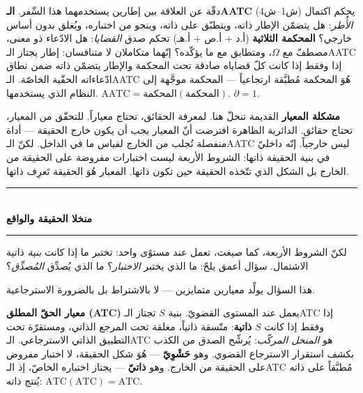 \documentclass[10pt, openany, oneside]{book}
\renewcommand{\normalsize}{\fontsize{10}{13}\selectfont}
\begin{document}
دقّة عن العلاقة بين إطارين يستخدمهما هذا السِّفر. \textbf{الـAATC} (ش1--ش4) يحكم اكتمال \textit{الأُطر}: هل يتضمّن الإطار ذاته، ويتطبّق على ذاته، وينجو من اختباره، ويُغلق بدون أساس خارجي؟ \textbf{المحكمة الثلاثية} (أ.د + أ.ص + أ.هـ) تحكم صدق \textit{القضايا}: هل الادّعاء ذو معنى، مصطفّ مع $\Omega$، ومتطابق مع ما يؤكّده؟ إنّهما متكاملان لا متنافسان: إطار يجتاز الـAATC إذا وفقط إذا كانت كلّ قضاياه صادقة تحت المحكمة والإطار يتضمّن ذاته ضمن نطاق ادّعاءاته الحقّية الخاصّة. الـAATC هُوَ المحكمة مُطبَّقة ارتجاعياً --- المحكمة موجَّهة إلى النظام الذي يستخدمها. $\text{AATC} = \text{المحكمة}(\text{المحكمة})$. $\partial = 1$.

\textbf{مشكلة المعيار} القديمة تنحلّ هنا. لمعرفة الحقائق، تحتاج معياراً. للتحقّق من المعيار، تحتاج حقائق. الدائرية الظاهرة افترضت أنّ المعيار يجب أن يكون خارج الحقيقة --- أداة منفصلة تُجلب من الخارج لقياس ما في الداخل. لكنّ الـAATC ليس خارجياً. إنّه داخليّ في بنية الحقيقة ذاتها: الشروط الأربعة ليست اختبارات مفروضة على الحقيقة من الخارج بل الشكل الذي تتّخذه الحقيقة حين تكون ذاتها. المعيار هُوَ الحقيقة تَعرِف ذاتها.

\vspace{1.5em}


\begin{center}
    \rule{0.3\textwidth}{0.4pt}\\[0.5em]
    {\normalsize\bfseries منخلا الحقيقة والواقع}\\[0.3em]
    \rule{0.3\textwidth}{0.4pt}
\end{center}

\vspace{1em}

\noindent لكنّ الشروط الأربعة، كما صيغت، تعمل عند مستوًى واحد: تختبر ما إذا كانت \textit{بنية} ذاتية الاشتمال. سؤال أعمق يلحّ: ما الذي يختبر \textit{الاختبار}؟ ما الذي يُصدِّق \textit{المُصدِّق}؟

هذا السؤال يولِّد معيارين متمايزين --- لا بالاشتراط بل بالضرورة الاسترجاعية.

\textbf{معيار الحقّ المطلق (ATC)} يعمل عند المستوى القضويّ. بنية $S$ تجتاز الـATC إذا وفقط إذا كانت $S$ \textbf{ذاتية}: متّسقة ذاتياً، مغلقة تحت المرجع الذاتي، ومستقرّة تحت التطبيق الذاتي الاسترجاعي. الـATC هو \textit{المنخل المركّب}: يُرشِّح الصدق من الكذب بكشف استقرار الاسترجاع القضوي. وهو \textbf{حَشْوِيّ} --- هُوَ شكل الحقيقة، لا اختبار مفروض على الحقيقة من الخارج. وهو \textbf{ذاتيّ} --- يجتاز اختباره الخاصّ، إذ الـATC مُطبَّقاً على ذاته يُنتج ذاته: $\text{ATC}(\text{ATC}) = \text{ATC}$.
\end{document}
